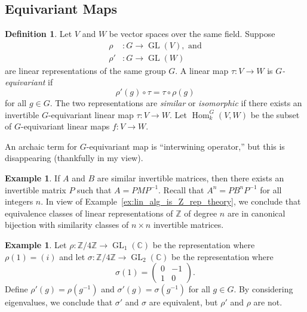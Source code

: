\documentclass[12pt]{article}
\theoremstyle{plain}
\theoremstyle{definition}
\newtheorem{definition}[theorem]{Definition}
\newtheorem{example}[theorem]{Example}
\theoremstyle{remark}
\numberwithin{equation}{section}
\begin{document}
\subsection{Equivariant Maps}

\begin{definition}
Let $V$ and $W$ be vector spaces over the same field.
Suppose
\begin{align*}
\rho &: G \to \operatorname{GL}(V), \textrm{ and}\\
\rho' &: G \to \operatorname{GL}(W)
\end{align*}
are linear representations of the same group $G$.
A linear map $\tau : V \to W$ is \emph{$G$-equivariant} if
\[
\rho'(g) \circ \tau = \tau \circ \rho(g)
\]
for all $g \in G$.
The two representations are \emph{similar} or \emph{isomorphic} if there
exists an invertible $G$-equivariant linear map $\tau : V \to W$.
Let $\operatorname{Hom}_k^G(V,W)$ be the subset of
$G$-equivariant linear maps $f : V \to W$.
\end{definition}

An archaic term for $G$-equivariant map is ``interwining operator,''
but this is disappearing (thankfully in my view).

\begin{example}
If $A$ and $B$ are similar invertible matrices, then there exists
an invertible matrix $P$ such that $A=PMP^{-1}$.
Recall that $A^n=PB^nP^{-1}$ for all integers $n$.
In view of Example~\ref{ex:lin_alg_is_Z_rep_theory}, we conclude that
equivalence classes of linear representations of
$\mathbb{Z}$ of degree $n$ are in canonical bijection with
similarity classes of $n \times n$ invertible matrices.
\end{example}

\begin{example}
Let $\rho : \mathbb{Z}/4\mathbb{Z} \to
\operatorname{GL}_1(\mathbb{C})$
be the representation where $\rho(1)=(i)$
and let $\sigma : \mathbb{Z}/4\mathbb{Z} \to
\operatorname{GL}_2(\mathbb{C})$
be the representation where
\[
\sigma(1) = \begin{pmatrix} 0&-1\\1&0 \end{pmatrix} .
\]
Define $\rho'(g)=\rho(g^{-1})$
and $\sigma'(g)=\sigma(g^{-1})$ for all $g \in G$.
By considering eigenvalues, we conclude that
$\sigma'$ and $\sigma$ are equivalent, but $\rho'$ and $\rho$ are not.
\end{example}
\end{document}
